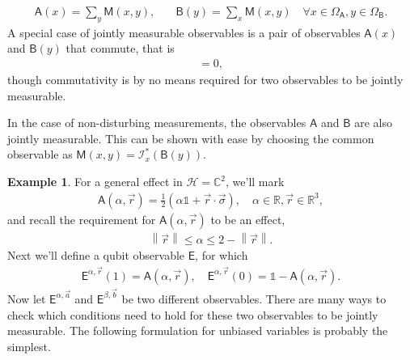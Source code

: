 \documentclass[a4paper,12pt]{wihuri}
\theoremstyle{definition}
\newtheorem{example}{Example}
\numberwithin{definition}{section}
\numberwithin{example}{section}
\numberwithin{theorem}{section}
\numberwithin{proposition}{section}
\numberwithin{lemma}{section}
\newcommand{\I}{\mathcal{I}}%
\newcommand{\hi}{\mathcal{H}}%
\newcommand{\A}{\mathsf{A}}%
\newcommand{\B}{\mathsf{B}}%
\newcommand{\M}{\mathsf{M}}%
\newcommand{\E}{\mathsf{E}}%
\newcommand{\id}{\mathds{1}}
\newcommand{\cc}{\mathbb{C}^2}%
\newcommand{\real}{\mathbb{R}}%
\newcommand{\norm}[1]{\left\lVert#1\right\rVert}
\begin{document}
\begin{align*}
\A(x) = \sum_y \M(x,y),&\quad \B(y) = \sum_x \M(x,y)\quad \forall x \in \Omega_{\A}, y \in \Omega_{\B}\text{.}
\end{align*}
A special case of jointly measurable observables is a pair of observables $\A(x)$ and $\B(y)$ that commute, that is
\begin{align*}
[\A(x), \B(y)] = 0,
\end{align*}
though commutativity is by no means required for two observables to be jointly measurable. 

In the case of non-disturbing measurements, the observables $\A$ and $\B$ are also jointly measurable. This can be shown with ease by choosing the common observable as $\M(x,y) = \I_x^*(\B(y))$.
\begin{example}
For a general effect in $\hi = \cc$, we'll mark 
\begin{align*}
\A(\alpha, \vec{r}) = \frac{1}{2}(\alpha\id + \vec{r}\cdot \vec{\sigma}), \quad \alpha \in \real, \vec{r} \in \real^3,
\end{align*}
and recall the requirement for $\A(\alpha, \vec{r})$ to be an effect,
\begin{align*}
\norm{\vec{r}} \leq \alpha \leq 2 - \norm{\vec{r}}\text{.}
\end{align*}
Next we'll define a qubit observable $\E$, for which
\begin{align*}
\E^{\alpha, \vec{r}}(1) = \A(\alpha,\vec{r}), \quad \E^{\alpha, \vec{r}}(0) = \id - \A(\alpha, \vec{r})\text{.}
\end{align*}
Now let $\E^{\alpha, \vec{a}}$ and $\E^{\beta, \vec{b}}$ be two different observables. There are many ways to check which conditions need to hold for these two observables to be jointly measurable\cite{heinosaari_notes_on_joint}. The following formulation for unbiased variables is probably the simplest.


\end{example}
\end{document}
